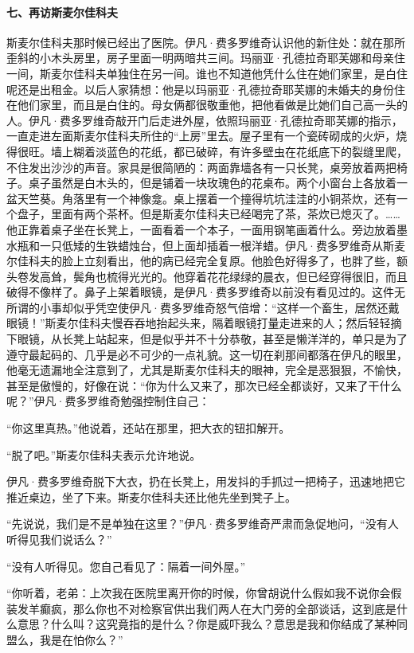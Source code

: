 \paragraph*{七、再访斯麦尔佳科夫}
\par 斯麦尔佳科夫那时候已经出了医院。伊凡·费多罗维奇认识他的新住处：就在那所歪斜的小木头房里，房子里面一明两暗共三间。玛丽亚·孔德拉奇耶芙娜和母亲住一间，斯麦尔佳科夫单独住在另一间。谁也不知道他凭什么住在她们家里，是白住呢还是出租金。以后人家猜想：他是以玛丽亚·孔德拉奇耶芙娜的未婚夫的身份住在他们家里，而且是白住的。母女俩都很敬重他，把他看做是比她们自己高一头的人。伊凡·费多罗维奇敲开门后走进外屋，依照玛丽亚·孔德拉奇耶芙娜的指示，一直走进左面斯麦尔佳科夫所住的“上房”里去。屋子里有一个瓷砖砌成的火炉，烧得很旺。墙上糊着淡蓝色的花纸，都已破碎，有许多壁虫在花纸底下的裂缝里爬，不住发出沙沙的声音。家具是很简陋的：两面靠墙各有一只长凳，桌旁放着两把椅子。桌子虽然是白木头的，但是铺着一块玫瑰色的花桌布。两个小窗台上各放着一盆天竺葵。角落里有一个神像龛。桌上摆着一个撞得坑坑洼洼的小铜茶炊，还有一个盘子，里面有两个茶杯。但是斯麦尔佳科夫已经喝完了茶，茶炊已熄灭了。……他正靠着桌子坐在长凳上，一面看着一个本子，一面用钢笔画着什么。旁边放着墨水瓶和一只低矮的生铁蜡烛台，但上面却插着一根洋蜡。伊凡·费多罗维奇从斯麦尔佳科夫的脸上立刻看出，他的病已经完全复原。他脸色好得多了，也胖了些，额头卷发高耸，鬓角也梳得光光的。他穿着花花绿绿的晨衣，但已经穿得很旧，而且破得不像样了。鼻子上架着眼镜，是伊凡·费多罗维奇以前没有看见过的。这件无所谓的小事却似乎凭空使伊凡·费多罗维奇怒气倍增：“这样一个畜生，居然还戴眼镜！”斯麦尔佳科夫慢吞吞地抬起头来，隔着眼镜打量走进来的人；然后轻轻摘下眼镜，从长凳上站起来，但是似乎并不十分恭敬，甚至是懒洋洋的，单只是为了遵守最起码的、几乎是必不可少的一点礼貌。这一切在刹那间都落在伊凡的眼里，他毫无遗漏地全注意到了，尤其是斯麦尔佳科夫的眼神，完全是恶狠狠，不愉快，甚至是傲慢的，好像在说：“你为什么又来了，那次已经全都谈好，又来了干什么呢？”伊凡·费多罗维奇勉强控制住自己：
\par “你这里真热。”他说着，还站在那里，把大衣的钮扣解开。
\par “脱了吧。”斯麦尔佳科夫表示允许地说。
\par 伊凡·费多罗维奇脱下大衣，扔在长凳上，用发抖的手抓过一把椅子，迅速地把它推近桌边，坐了下来。斯麦尔佳科夫还比他先坐到凳子上。
\par “先说说，我们是不是单独在这里？”伊凡·费多罗维奇严肃而急促地问，“没有人听得见我们说话么？”
\par “没有人听得见。您自己看见了：隔着一间外屋。”
\par “你听着，老弟：上次我在医院里离开你的时候，你曾胡说什么假如我不说你会假装发羊癫疯，那么你也不对检察官供出我们两人在大门旁的全部谈话，这到底是什么意思？什么叫？这究竟指的是什么？你是威吓我么？意思是我和你结成了某种同盟么，我是在怕你么？”
